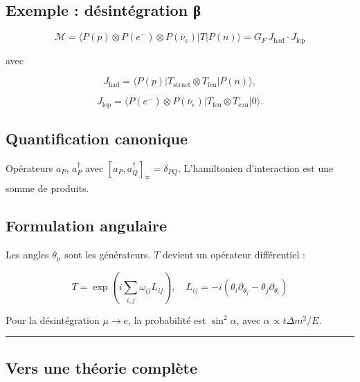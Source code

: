 \documentclass[11pt]{article}
\begin{document}
\hypertarget{exemple-duxe9sintuxe9gration-ux3b2}{%
\subsection{Exemple : désintégration
β}\label{exemple-duxe9sintuxe9gration-ux3b2}}

\[
\mathcal{M} = \langle P(p) \otimes P(e^-) \otimes P(\bar{\nu}_e) | T | P(n) \rangle = G_F \, J_{\text{had}} \cdot J_{\text{lep}}
\]

avec

\[
J_{\text{had}} = \langle P(p) | T_{\text{struct}} \otimes T_{\text{feu}} | P(n) \rangle,
\]

\[
J_{\text{lep}} = \langle P(e^-) \otimes P(\bar{\nu}_e) | T_{\text{feu}} \otimes T_{\text{eau}} |0\rangle.
\]

\hypertarget{quantification-canonique}{%
\subsection{Quantification canonique}\label{quantification-canonique}}

Opérateurs \(a_P\), \(a_P^\dagger\) avec
\([a_P, a_Q^\dagger]_{\mp} = \delta_{PQ}\). L'hamiltonien d'interaction
est une somme de produits.

\hypertarget{formulation-angulaire}{%
\subsection{Formulation angulaire}\label{formulation-angulaire}}

Les angles \(\theta_\mu\) sont les générateurs. \(T\) devient un
opérateur différentiel :

\[
T = \exp\!\left( i \sum_{i,j} \omega_{ij} L_{ij} \right), \quad L_{ij} = -i(\theta_i \partial_{\theta_j} - \theta_j \partial_{\theta_i})
\]

Pour la désintégration \(\mu \to e\), la probabilité est
\(\sin^2\alpha\), avec \(\alpha \propto t \Delta m^2/E\).

\begin{center}\rule{0.5\linewidth}{0.5pt}\end{center}

\hypertarget{vers-une-thuxe9orie-compluxe8te}{%
\subsection{Vers une théorie
complète}\label{vers-une-thuxe9orie-compluxe8te}}
\end{document}
